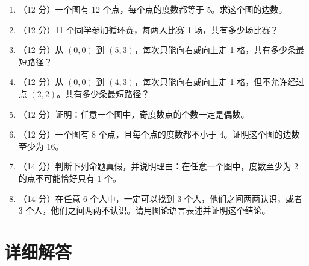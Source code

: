 \documentclass[11pt,a4paper,fontset=fandol]{ctexart}
\newcommand{\answerspace}{\vspace{2.3cm}}
\newcommand{\biganswerspace}{\vspace{3.2cm}}
\begin{document}
\begin{enumerate}
  \item （12 分）一个图有 12 个点，每个点的度数都等于 5。求这个图的边数。
  \answerspace

  \item （12 分）11 个同学参加循环赛，每两人比赛 1 场，共有多少场比赛？
  \answerspace

  \item （12 分）从 $(0,0)$ 到 $(5,3)$，每次只能向右或向上走 1 格，共有多少条最短路径？
  \answerspace

  \item （12 分）从 $(0,0)$ 到 $(4,3)$，每次只能向右或向上走 1 格，但不允许经过点 $(2,2)$。共有多少条最短路径？
  \begin{center}
  \end{center}
  \biganswerspace

  \item （12 分）证明：任意一个图中，奇度数点的个数一定是偶数。
  \answerspace

  \item （12 分）一个图有 8 个点，且每个点的度数都不小于 4。证明这个图的边数至少为 16。
  \answerspace

  \item （14 分）判断下列命题真假，并说明理由：在任意一个图中，度数至少为 2 的点不可能恰好只有 1 个。
  \biganswerspace

  \item （14 分）在任意 6 个人中，一定可以找到 3 个人，他们之间两两认识，或者 3 个人，他们之间两两不认识。请用图论语言表述并证明这个结论。
  \biganswerspace
\end{enumerate}

\newpage
\section{详细解答}
\end{document}

